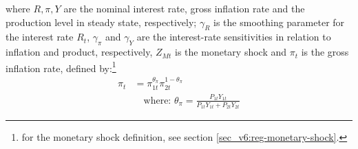 \documentclass[../thesis.tex]{subfiles}
\begin{document}
where $R, \pi, Y$ are the nominal interest rate, gross inflation rate and the production level in steady state, respectively; $\gamma_{R}$ is the smoothing parameter for the interest rate $R_{t}$, $\gamma_{\pi}$ and $\gamma_{Y}$ are the interest-rate sensitivities in relation to inflation and product, respectively, $Z_{Mt}$ is the monetary shock and $\pi_t$ is the gross inflation rate, defined by:\footnote{for the monetary shock definition, see section \ref{sec_v6:reg-monetary-shock}.}
\begin{align}
	\pi_{t} &= \pi_{1t}^{\theta_{\pi}} \pi_{2t}^{1 - \theta_{\pi}}
	\label{ext-mod:reg-gross-inflation-rate} \\ 
	&\quad \text{where: } \theta_{\pi} = \frac{P_{1t} Y_{1t}}{P_{1t} Y_{1t} + P_{2t} Y_{2t}} \label{ext-mod:reg-theta-pi}
\end{align}

\begin{comment}

where $P_t$ is the national price level, defined by:
\begin{align}
	P_{t} Y_{t} &= P_{1t} Y_{1t} + P_{2t} Y_{2t} \iff P_{t} = \frac{P_{1t} Y_{1t} + P_{2t} Y_{2t}}{Y_{t}} \label{ext-mod:reg-national-price-level}
\end{align}
	
	\begin{align}
		P_{t} Y_{t} &= P_{1t} Y_{1t} + P_{2t} Y_{2t} \implies \nonumber \\
		P_{t} &= \frac{Y_{1t}}{Y_{t}} P_{1t} + \frac{Y_{2t}}{Y_{t}} P_{2t} \implies \nonumber \\
		P_{t} &= \theta_{P1} P_{1t} + (1 -\theta_{P1}) P_{2t} %
	\end{align}
	
	where $\theta_{P1}$ and $(1-\theta_{P1})$ are the price level weights of regions 1 and 2 in the national price level composition, respectively:
	\begin{align}
		\left\langle \begin{matrix} \theta_{P1} & (1-\theta_{P1}) \end{matrix} \right\rangle \coloneq \left\langle \begin{matrix} \frac{Y_{1t}}{Yt} & \frac{Y_{2t}}{Yt} \end{matrix} \right\rangle \label{ext-mod:reg-ss-P1-P2-weight-in-P}
	\end{align}
\end{comment}

\end{document}

